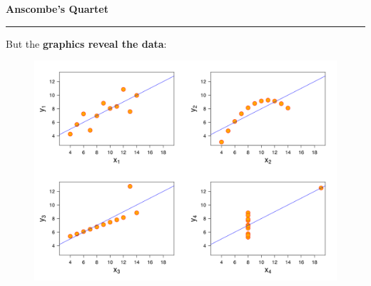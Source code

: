 \documentclass[pdf]{beamer}
\begin{document}
\begin{frame}
    {{\textbf{Anscombe’s Quartet}}}{\textcolor{red}{\rule{12cm}{1.2pt}}}

But the \textbf{graphics reveal the data}:
    
\begin{figure}
\includegraphics[scale=0.2]{15_Anscombe's_quartet.png}
\end{figure}

\end{frame}



\end{document}
